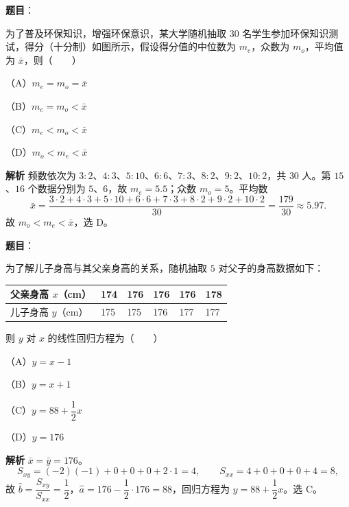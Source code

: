 \begin{answer}

\textbf{题目}：

为了普及环保知识，增强环保意识，某大学随机抽取 $30$ 名学生参加环保知识测试，得分（十分制）如图所示，假设得分值的中位数为 $m_e$，众数为 $m_o$，平均值为 $\bar x$，则\mbox{（　　）}

（A）$m_e=m_o=\bar x$

（B）$m_e=m_o<\bar x$

（C）$m_e<m_o<\bar x$

（D）$m_o<m_e<\bar x$
\nopagebreak[4]
\begin{center}\end{center}
\nopagebreak[4]
\textbf{解析}
频数依次为 $3:2$、$4:3$、$5:10$、$6:6$、$7:3$、$8:2$、$9:2$、$10:2$，共 $30$ 人。第 $15$、$16$ 个数据分别为 $5$、$6$，故 $m_e=5.5$；众数 $m_o=5$。平均数
\nopagebreak[4]
\[\bar x=\frac{3\cdot2+4\cdot3+5\cdot10+6\cdot6+7\cdot3+8\cdot2+9\cdot2+10\cdot2}{30}=\frac{179}{30}\approx5.97.\]
故 $m_o<m_e<\bar x$，选 D。


\end{answer}
\begin{answer}

\textbf{题目}：

为了解儿子身高与其父亲身高的关系，随机抽取 $5$ 对父子的身高数据如下：

\begin{center}
\begin{tabular}{llllll}
\toprule
父亲身高 $x$（cm） & 174 & 176 & 176 & 176 & 178 \\
\midrule
儿子身高 $y$（cm） & 175 & 175 & 176 & 177 & 177 \\
\bottomrule
\end{tabular}
\end{center}

则 $y$ 对 $x$ 的线性回归方程为\mbox{（　　）}

（A）$y=x-1$

（B）$y=x+1$

（C）$y=88+\dfrac12x$

（D）$y=176$

\textbf{解析}
$\bar x=\bar y=176$。
\nopagebreak[4]
\[S_{xy}=(-2)(-1)+0+0+0+2\cdot1=4,\qquad S_{xx}=4+0+0+0+4=8,\]
故 $\hat b=\dfrac{S_{xy}}{S_{xx}}=\dfrac12$，$\hat a=176-\dfrac12\cdot176=88$，回归方程为 $y=88+\dfrac12x$。选 C。


\end{answer}
